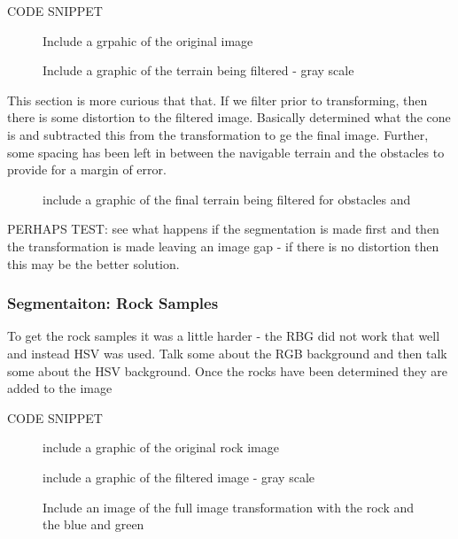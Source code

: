 \documentclass[a4paper]{article}
\begin{document}
CODE SNIPPET

\begin{figure}
\begin{minipage}{0.45\linewidth}
\centering
\caption{Include a grpahic of the original image}
\end{minipage}
\begin{minipage}{0.45\linewidth}
\centering
\caption{Include a graphic of the terrain being filtered - gray scale}
\end{minipage}
\end{figure}

This section is more curious that that. If we filter prior to transforming, then there is some distortion to the filtered image. Basically determined what the cone is and subtracted this from the transformation to ge the final image. Further, some spacing has been left in between the navigable terrain and the obstacles to provide for a margin of error.

\begin{figure}
\centering
\caption{include a graphic of the final terrain being filtered for obstacles and }
\end{figure}

PERHAPS TEST: see what happens if the segmentation is made first and then the transformation is made leaving an image gap - if there is no distortion then this may be the better solution.

\subsubsection{Segmentaiton: Rock Samples}
To get the rock samples it was a little harder - the RBG did not work that well and instead HSV was used. Talk some about the RGB background and then talk some about the HSV background. Once the rocks have been determined they are added to the image

CODE SNIPPET

\begin{figure}
\begin{minipage}{0.45\linewidth}
\centering
\caption{include a graphic of the original rock image}
\end{minipage}
\begin{minipage}{0.45\linewidth}
\centering
\caption{include a graphic of the filtered image - gray scale}
\end{minipage}
\end{figure}

\begin{figure}
\centering
\caption{Include an image of the full image transformation with the rock and the blue and green}
\end{figure}
\end{document}
